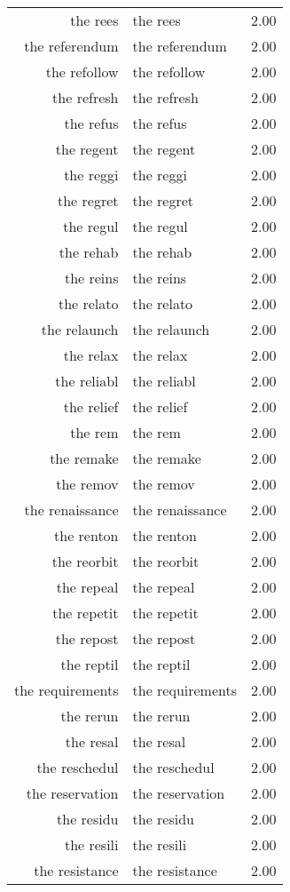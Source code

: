 \begin{table}[ht]
\begin{tabular}{rlr}
  the rees & the rees & 2.00 \\ 
  the referendum & the referendum & 2.00 \\ 
  the refollow & the refollow & 2.00 \\ 
  the refresh & the refresh & 2.00 \\ 
  the refus & the refus & 2.00 \\ 
  the regent & the regent & 2.00 \\ 
  the reggi & the reggi & 2.00 \\ 
  the regret & the regret & 2.00 \\ 
  the regul & the regul & 2.00 \\ 
  the rehab & the rehab & 2.00 \\ 
  the reins & the reins & 2.00 \\ 
  the relato & the relato & 2.00 \\ 
  the relaunch & the relaunch & 2.00 \\ 
  the relax & the relax & 2.00 \\ 
  the reliabl & the reliabl & 2.00 \\ 
  the relief & the relief & 2.00 \\ 
  the rem & the rem & 2.00 \\ 
  the remake & the remake & 2.00 \\ 
  the remov & the remov & 2.00 \\ 
  the renaissance & the renaissance & 2.00 \\ 
  the renton & the renton & 2.00 \\ 
  the reorbit & the reorbit & 2.00 \\ 
  the repeal & the repeal & 2.00 \\ 
  the repetit & the repetit & 2.00 \\ 
  the repost & the repost & 2.00 \\ 
  the reptil & the reptil & 2.00 \\ 
  the requirements & the requirements & 2.00 \\ 
  the rerun & the rerun & 2.00 \\ 
  the resal & the resal & 2.00 \\ 
  the reschedul & the reschedul & 2.00 \\ 
  the reservation & the reservation & 2.00 \\ 
  the residu & the residu & 2.00 \\ 
  the resili & the resili & 2.00 \\ 
  the resistance & the resistance & 2.00 \\ 

\end{tabular}
\end{table}
